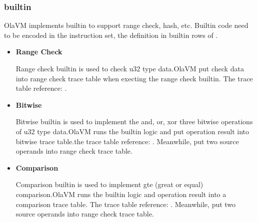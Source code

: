 \subsubsection{builtin}\label{subsec: instructions-builtin}
OlaVM implements builtin to support range check, hash, etc.
Builtin code need to be encoded in the instruction set, the definition in builtin rows of .

\begin{itemize}
    \item \textbf{Range Check}

Range check builtin is used to check u32 type data.OlaVM put check data into range check trace table when execting the range check builtin. The trace table reference: .
    \item \textbf{Bitwise}

Bitwise builtin is used to implement the and, or, xor three bitwise operations of u32 type data.OlaVM runs the builtin logic and put operation result into bitwise trace table.the trace table reference: .
Meanwhile, put two source operands into range check trace table.
    \item \textbf{Comparison}

Comparison builtin is used to implement gte (great or equal) comparison.OlaVM runs the builtin logic and operation result into a comparison trace table.
The trace table reference: .
Meanwhile, put two source operands into range check trace table.
\end{itemize}
